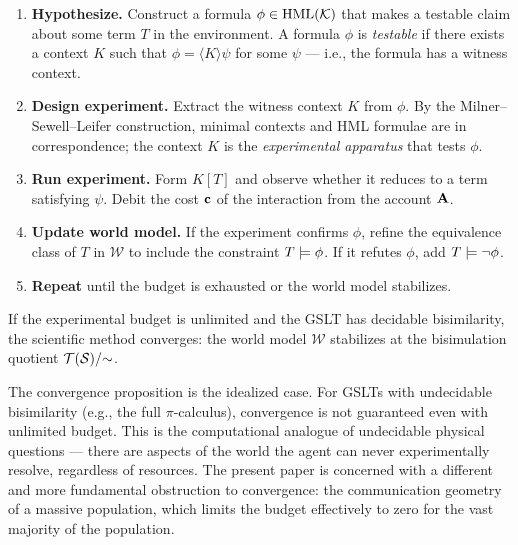 \begin{enumerate}[label=\textbf{Step \arabic*.}, leftmargin=*, itemsep=4pt]
  \item \textbf{Hypothesize.} Construct a formula
        $\phi \in \mathrm{HML}(\mathcal{K})$ that makes a testable claim about
        some term $T$ in the environment.
        A formula $\phi$ is \emph{testable} if there exists a
        context $K$ such that $\phi = \langle K \rangle \psi$
        for some $\psi$ --- i.e., the formula has a witness context.

  \item \textbf{Design experiment.} Extract the witness context $K$
        from $\phi$.
        By the Milner--Sewell--Leifer construction, minimal contexts
        and HML formulae are in correspondence; the context $K$ is
        the \emph{experimental apparatus} that tests $\phi$.

  \item \textbf{Run experiment.} Form $K[T]$ and observe whether it
        reduces to a term satisfying $\psi$.
        Debit the cost $\mathbf{c}$ of the interaction from the account
        $\mathbf{A}$.

  \item \textbf{Update world model.} If the experiment confirms $\phi$,
        refine the equivalence class of $T$ in $\mathcal{W}$ to include
        the constraint $T \models \phi$.
        If it refutes $\phi$, add $T \models \neg\phi$.

  \item \textbf{Repeat} until the budget is exhausted or the world
        model stabilizes.
\end{enumerate}

\begin{proposition}
If the experimental budget is unlimited and the GSLT has decidable
bisimilarity, the scientific method converges: the world model
$\mathcal{W}$ stabilizes at the bisimulation quotient
$\mathcal{T}(\mathcal{S})/{\sim}$.
\end{proposition}

\begin{remark}
The convergence proposition is the idealized case.
For GSLTs with undecidable bisimilarity (e.g., the full
$\pi$-calculus), convergence is not guaranteed even with
unlimited budget.
This is the computational analogue of undecidable physical questions ---
there are aspects of the world the agent can never experimentally resolve,
regardless of resources.
The present paper is concerned with a different and more fundamental
obstruction to convergence: the communication geometry of a massive
population, which limits the budget effectively to zero for the
vast majority of the population.
\end{remark}

